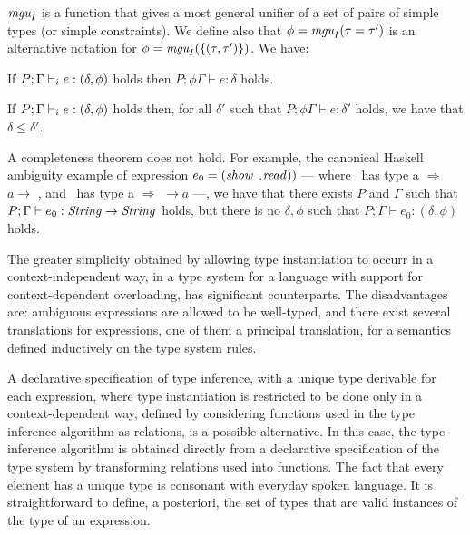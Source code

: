 $\mbox{\it mgu}_I$ is a function that gives a most general unifier of a set of
pairs of simple types (or simple constraints). We define also that
$\phi = \mbox{\it mgu}_I(\tau = \tau')$ is an alternative notation for
$\phi = \mbox{\it mgu}_I(\{(\tau, \tau')\})$. We have:

\begin{Theorem}[Soundness]

If $P;\Gamma \vdash_i e: (\delta,\phi)$ holds then $P;\phi\Gamma \vdash e: \delta$ holds.

\label{thm:type-inference-sound}
\end{Theorem}

\begin{Theorem}

If $P;\Gamma \vdash_i e: (\delta,\phi)$ holds then, for all $\delta'$ such
that $P;\phi\Gamma \vdash e: \delta'$ holds, we have that $\delta \leq
\delta'$.

\label{thm:principal-type}
\end{Theorem}

A completeness theorem does not hold. For example, the canonical
Haskell ambiguity example of expression $e_0 = (\sshow\ $\!\!$.$\!\!$
{\it read\/}))$ --- where \sshow\ has type \SShow a $\Rightarrow$ $a
\rightarrow$ \String, and \rread\ has type \RRead a $\Rightarrow$
\String $\rightarrow a$ ---, we have that there exists $P$ and
$\Gamma$ such that $P;\Gamma \vdash e_0: {\it String\/} \rightarrow {\it String\/}$
holds, but there is no $\delta,\phi$ such that $P;\Gamma \vdash e_0:
(\delta,\phi)$ holds.

The greater simplicity obtained by allowing type instantiation to
occurr in a context-independent way, in a type system for a language
with support for context-dependent overloading, has significant
counterparts. The disadvantages are: ambiguous expressions are allowed
to be well-typed, and there exist several translations for
expressions, one of them a principal translation, for a semantics
defined inductively on the type system rules.

A declarative specification of type inference, with a unique type
derivable for each expression, where type instantiation is restricted
to be done only in a context-dependent way, defined by considering
functions used in the type inference algorithm as relations, is a
possible alternative. In this case, the type inference algorithm is
obtained directly from a declarative specification of the type system
by transforming relations used into functions. The fact that every
element has a unique type is consonant with everyday spoken
language. It is straightforward to define, a posteriori, the set of
types that are valid instances of the type of an expression.

